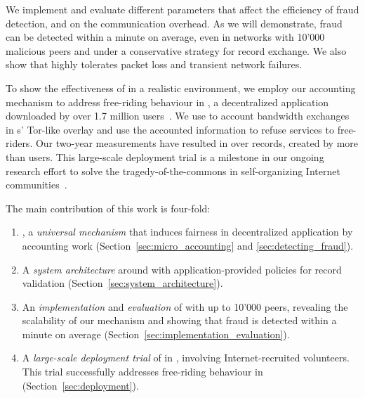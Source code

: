 We implement \ModelName{} and evaluate different parameters that affect the efficiency of fraud detection, and on the communication overhead.
As we will demonstrate, fraud can be detected within a minute on average, even in networks with 10'000 malicious peers and under a conservative strategy for record exchange.
We also show that \ModelName{} highly tolerates packet loss and transient network failures.

To show the effectiveness of \ModelName{} in a realistic environment, we employ our accounting mechanism to address free-riding behaviour in \Tribler{}, a decentralized application downloaded by over 1.7 million users~\cite{pouwelse2008tribler}.
We use \ModelName{} to account bandwidth exchanges in \Tribler{}s' Tor-like overlay and use the accounted information to refuse services to free-riders.
Our two-year measurements have resulted in over \TrialRecords{} records, created by more than \TrialUsers{} users.
This large-scale deployment trial is a milestone in our ongoing research effort to solve the tragedy-of-the-commons in self-organizing Internet communities~\cite{de2018blockchain}.

The main contribution of this work is four-fold:
\begin{enumerate}
	\item \ModelName{}, a \emph{universal mechanism} that induces fairness in decentralized application by accounting work (Section~\ref{sec:micro_accounting} and \ref{sec:detecting_fraud}).
	\item A \emph{system architecture} around \ModelName{} with application-provided policies for record validation (Section~\ref{sec:system_architecture}).
	\item An \emph{implementation} and \emph{evaluation} of \ModelName{} with up to 10'000 peers, revealing the scalability of our mechanism and showing that fraud is detected within a minute on average (Section~\ref{sec:implementation_evaluation}).
	\item A \emph{large-scale deployment trial} of \ModelName{} in \Tribler{}, involving \TrialUsers{} Internet-recruited volunteers. This trial successfully addresses free-riding behaviour in \Tribler{} (Section~\ref{sec:deployment}).
\end{enumerate}



